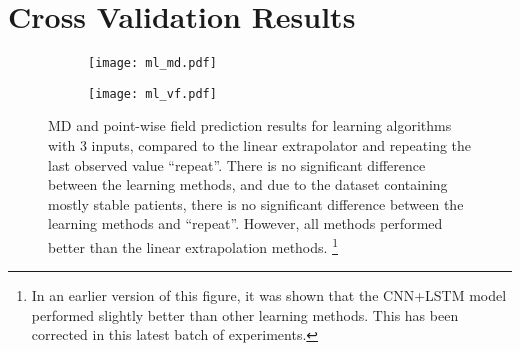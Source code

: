 \section{Cross Validation Results}


\begin{figure}[p]
\begin{minipage}{\textwidth}
	\centering
	\begin{subfigure}[b]{\textwidth}
		\centering
		\texttt{[image: ml\_md.pdf]}
		\caption{}
	\end{subfigure}
	\hfill
	\begin{subfigure}[b]{\textwidth}
		\centering
		\texttt{[image: ml\_vf.pdf]}
		\caption{}
	\end{subfigure}
	\caption[\acs{MD} and point-wise field prediction results for learning algorithms]{\acs{MD} and point-wise field prediction results for learning algorithms with 3 inputs, compared to the linear extrapolator and repeating the last observed value ``repeat''. There is no significant difference between the learning methods, and due to the dataset containing mostly stable patients, there is no significant difference between the learning methods and ``repeat''. However, all methods performed better than the linear extrapolation methods. \footnote{In an earlier version of this figure, it was shown that the CNN+LSTM model performed slightly better than other learning methods. This has been corrected in this latest batch of experiments.}}
	\label{fig:ml_fig}
\end{minipage}
\end{figure}


